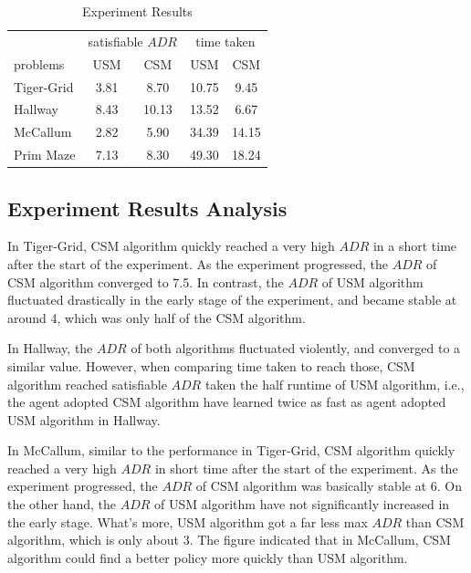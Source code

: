 \documentclass{article}
\begin{document}
\begin{table}[h]
	\caption{Experiment Results}
	\label{table:results}
	\centering
	\begin{tabular}{lcccc}
		\toprule
                  &\multicolumn{2}{c}{satisfiable $ADR$}      &\multicolumn{2}{c}{time taken} \\ 
                  \cmidrule(r){2-3}                 \cmidrule(r){4-5}
    problems      & USM         & CSM               &USM           & CSM      \\
    \midrule
		Tiger-Grid    & 3.81        & 8.70              & 10.75        & 9.45     \\ 
		Hallway       & 8.43        & 10.13             & 13.52        & 6.67     \\ 
		McCallum      & 2.82        & 5.90              & 34.39        & 14.15    \\ 
    Prim Maze     & 7.13        & 8.30              & 49.30        & 18.24    \\ 
    \bottomrule
	\end{tabular}
\end{table}

\subsection{Experiment Results Analysis}

In Tiger-Grid, CSM algorithm quickly reached a very high $ADR$ in a short
time after the start of the experiment. As the experiment progressed, the $ADR$ of
CSM algorithm converged to 7.5. In contrast, the $ADR$ of USM algorithm fluctuated
drastically in the early stage of the experiment, and became stable at around 4, which
was only half of the CSM algorithm.

In Hallway, the $ADR$ of both algorithms fluctuated violently,  
and converged to a similar value. However, when comparing time taken to reach those,
CSM algorithm reached satisfiable $ADR$ taken the half runtime of USM algorithm, i.e.,
the agent adopted CSM algorithm have learned twice as fast as agent adopted USM algorithm
in Hallway.

In McCallum, similar to the performance in Tiger-Grid, CSM algorithm quickly reached
a very high $ADR$ in short time after the start of the experiment. As the experiment
progressed, the $ADR$ of CSM algorithm was basically stable at 6. On the other hand,
the $ADR$ of USM algorithm have not significantly increased in the early stage. What's more,
USM algorithm got a far less max $ADR$ than CSM algorithm, which is only about 3. The figure
indicated that in McCallum, CSM algorithm could find a better policy more quickly than USM
algorithm.
\end{document}

